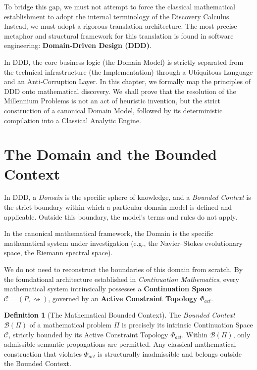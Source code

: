 \documentclass[12pt,openany]{extbook}
\theoremstyle{plain}
\theoremstyle{definition}
\newtheorem{definition}{Definition}[chapter]
\begin{document}
To bridge this gap, we must not attempt to force the classical mathematical establishment to adopt the internal terminology of the Discovery Calculus. Instead, we must adopt a rigorous translation architecture. The most precise metaphor and structural framework for this translation is found in software engineering: \textbf{Domain-Driven Design (DDD)}. 

In DDD, the core business logic (the Domain Model) is strictly separated from the technical infrastructure (the Implementation) through a Ubiquitous Language and an Anti-Corruption Layer. In this chapter, we formally map the principles of DDD onto mathematical discovery. We shall prove that the resolution of the Millennium Problems is not an act of heuristic invention, but the strict construction of a canonical Domain Model, followed by its deterministic compilation into a Classical Analytic Engine.

\section{The Domain and the Bounded Context}

In DDD, a \emph{Domain} is the specific sphere of knowledge, and a \emph{Bounded Context} is the strict boundary within which a particular domain model is defined and applicable. Outside this boundary, the model's terms and rules do not apply.

In the canonical mathematical framework, the Domain is the specific mathematical system under investigation (e.g., the Navier--Stokes evolutionary space, the Riemann spectral space). 

We do not need to reconstruct the boundaries of this domain from scratch. By the foundational architecture established in \emph{Continuation Mathematics}, every mathematical system intrinsically possesses a \textbf{Continuation Space} $\mathcal{C} = (P, \rightsquigarrow)$, governed by an \textbf{Active Constraint Topology} $\Phi_{act}$. 

\begin{definition}[The Mathematical Bounded Context]
The \emph{Bounded Context} $\mathcal{B}(\Pi)$ of a mathematical problem $\Pi$ is precisely its intrinsic Continuation Space $\mathcal{C}$, strictly bounded by its Active Constraint Topology $\Phi_{act}$. Within $\mathcal{B}(\Pi)$, only admissible semantic propagations are permitted. Any classical mathematical construction that violates $\Phi_{act}$ is structurally inadmissible and belongs outside the Bounded Context.
\end{definition}
\end{document}
